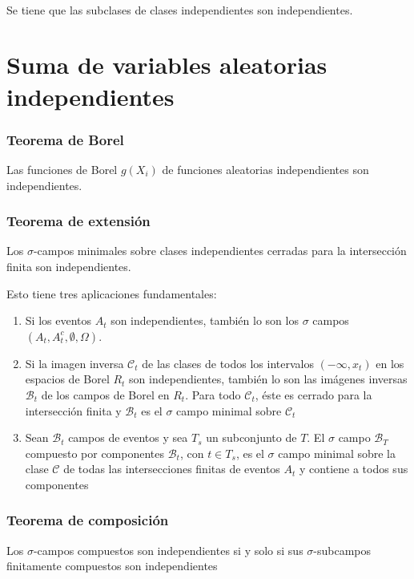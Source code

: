 \documentclass[12pt,a4paper]{book}
\begin{document}
\begin{theorem}
	\
	
Se tiene que las subclases de clases independientes son independientes.
\end{theorem}

\section{Suma de variables aleatorias independientes}
\subsubsection{Teorema de Borel}
\begin{theorem}
Las funciones de Borel $g(X_i)$ de funciones aleatorias independientes son independientes.
\end{theorem}
\subsubsection{Teorema de extensión}
\begin{theorem}
Los $\sigma$-campos minimales sobre clases independientes cerradas para la intersección finita son independientes.
\end{theorem}
Esto tiene tres aplicaciones fundamentales:
\begin{enumerate}
\item Si los eventos $A_t$ son independientes, también lo son los $\sigma$ campos $(A_t , A_t^c , \emptyset , \Omega)$.
\item Si la imagen inversa $\mathcal{C}_t$ de las clases de todos los intervalos $(-\infty, x_t)$ en los espacios de Borel $R_t$ son independientes, también lo son las imágenes inversas $\mathcal{B}_t$ de los campos de Borel en $R_t$. Para todo $\mathcal{C}_t$, éste es cerrado para la intersección finita y $\mathcal{B}_t$ es el $\sigma$ campo minimal sobre $\mathcal{C}_t$
\item Sean $\mathcal{B}_t$ campos de eventos y sea $T_s$ un subconjunto de $T$. El $\sigma$ campo $\mathcal{B}_T$ compuesto por componentes $\mathcal{B}_t$, con $t\in T_s$, es el $\sigma$ campo minimal sobre la clase $\mathcal{C}$ de todas las intersecciones finitas de eventos $A_t$ y contiene a todos sus componentes
\end{enumerate}
\subsubsection{Teorema de composición}
\begin{theorem}
Los $\sigma$-campos compuestos son independientes si y solo si sus $\sigma$-subcampos finitamente compuestos son independientes
\end{theorem}
\end{document}
